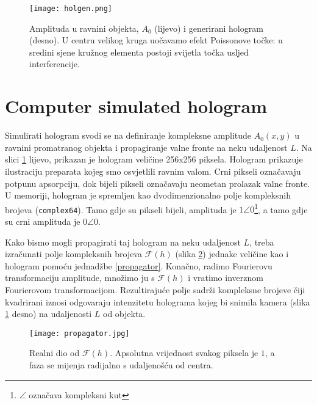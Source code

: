 \documentclass[hidelinks]{ferseminareng}
\begin{document}
	
	\begin{figure}
		\texttt{[image: holgen.png]}
		\caption{Amplituda u ravnini objekta, $A_0$ (lijevo) i generirani hologram (desno). U centru velikog kruga uočavamo efekt Poissonove točke: u sredini sjene kružnog elementa postoji svijetla točka usljed interferencije.}
		\label{simulation}
	\end{figure}
	
	\section{Computer simulated hologram}
	Simulirati hologram svodi se na definiranje kompleksne amplitude $A_0(x,y)$ u ravnini promatranog objekta i propagiranje valne fronte na neku udaljenost $L$. Na slici \ref{simulation} lijevo, prikazan je hologram veličine 256x256 piksela. Hologram prikazuje ilustraciju preparata kojeg smo osvjetlili ravnim valom. Crni pikseli označavaju potpunu apsorpciju, dok bijeli pikseli označavaju neometan prolazak valne fronte. U memoriji, hologram je spremljen kao dvodimenzionalno polje kompleksnih brojeva (\lstinline{complex64}). Tamo gdje su pikseli bijeli, amplituda je $1\angle0$\footnote{$\angle$ označava kompleksni kut}, a tamo gdje su crni amplituda je $0\angle0$.
	
	Kako bismo mogli propagirati taj hologram na neku udaljenost $L$, treba izračunati polje kompleksnih brojeva $\mathcal{F}(h)$ (slika \ref{propagator_img}) jednake veličine kao i hologram pomoću jednadžbe \ref{propagator}. Konačno, radimo Fourierovu transformaciju amplitude, množimo ju s $\mathcal{F}(h)$ i vratimo inverznom Fourierovom transformacijom. Rezultirajuće polje sadrži kompleksne brojeve čiji kvadrirani iznosi odgovaraju intenzitetu holograma kojeg bi snimila kamera (slika \ref{simulation} desno) na udaljenosti $L$ od objekta.
	
	\begin{figure}
		\centering
		\texttt{[image: propagator.jpg]}
		\caption{Realni dio od $\mathcal{F}(h)$. Apsolutna vrijednost svakog piksela je $1$, a faza se mijenja radijalno s udaljenošću od centra.}
		\label{propagator_img}
	\end{figure}
	
\end{document}
